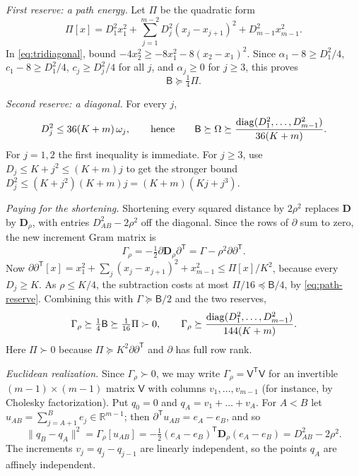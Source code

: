 \documentclass[11pt]{article}
\numberwithin{equation}{section}
\theoremstyle{definition}\newtheorem{definition}[theorem]{Definition}
\theoremstyle{remark}\newtheorem{remark}[theorem]{Remark}
\newcommand{\R}{\mathbb R}\newcommand{\N}{\mathbb N}
\newcommand{\norm}[1]{\lVert #1\rVert}
\newcommand{\T}{\mathsf T}\newcommand{\one}{\mathbf1}
\begin{document}
\emph{First reserve: a path energy.} Let $\Pi$ be the quadratic form
\[
 \Pi[x]=D_1^2x_1^2+\sum_{j=1}^{m-2}D_j^2(x_j-x_{j+1})^2+D_{m-1}^2x_{m-1}^2.
\]
In \eqref{eq:tridiagonal}, bound $-4x_2^2\ge-8x_1^2-8(x_2-x_1)^2$. Since
$\alpha_1-8\ge D_1^2/4$, $c_1-8\ge D_1^2/4$, $c_j\ge D_j^2/4$ for all $j$,
and $\alpha_j\ge0$ for $j\ge3$, this proves
\begin{equation}\label{eq:path-reserve}
 \mathsf B\succeq\tfrac14\Pi.
\end{equation}

\emph{Second reserve: a diagonal.} For every $j$,
\begin{equation}\label{eq:diagonal-reserve}
 D_j^2\le36(K+m)\,\omega_j,
 \qquad\text{hence}\qquad
 \mathsf B\succeq\Omega\succeq\frac{\operatorname{diag}(D_1^2,\ldots,D_{m-1}^2)}{36(K+m)}.
\end{equation}
For $j=1,2$ the first inequality is immediate. For $j\ge3$, use
$D_j\le K+j^2\le(K+m)j$ to get the stronger bound
$D_j^2\le(K+j^2)(K+m)j=(K+m)(Kj+j^3)$.

\emph{Paying for the shortening.} Shortening every squared distance by
$2\rho^2$ replaces $\mathbf D$ by $\mathbf D_\rho$, with entries
$D_{AB}^2-2\rho^2$ off the diagonal. Since the rows of $\partial$ sum to
zero, the new increment Gram matrix is
\[
 \Gamma_\rho=-\tfrac12\partial\mathbf D_\rho\partial^\T
 =\Gamma-\rho^2\partial\partial^\T.
\]
Now $\partial\partial^\T[x]=x_1^2+\sum_j(x_j-x_{j+1})^2+x_{m-1}^2\le
\Pi[x]/K^2$, because every $D_j\ge K$. As $\rho\le K/4$, the subtraction
costs at most $\Pi/16\preceq\mathsf B/4$, by \eqref{eq:path-reserve}.
Combining this with $\Gamma\succeq\mathsf B/2$ and the two reserves,
\begin{equation}\label{eq:both-reserves}
 \Gamma_\rho\succeq\tfrac14\mathsf B\succeq\tfrac1{16}\Pi\succ0,
 \qquad
 \Gamma_\rho\succeq
     \frac{\operatorname{diag}(D_1^2,\ldots,D_{m-1}^2)}{144(K+m)}.
\end{equation}
Here $\Pi\succ0$ because $\Pi\succeq K^2\partial\partial^\T$ and $\partial$
has full row rank.

\emph{Euclidean realization.} Since $\Gamma_\rho\succ0$, we may write
$\Gamma_\rho=\mathsf V^\T\mathsf V$ for an invertible
$(m-1)\times(m-1)$ matrix $\mathsf V$ with columns $v_1,\dots,v_{m-1}$
(for instance, by Cholesky factorization). Put $q_0=0$ and
$q_A=v_1+\dots+v_A$. For $A<B$ let $u_{AB}=\sum_{j=A+1}^Be_j\in\R^{m-1}$;
then $\partial^\T u_{AB}=e_A-e_B$, and so
\[
 \norm{q_B-q_A}^2
 =\Gamma_\rho[u_{AB}]
 =-\tfrac12(e_A-e_B)^\T\mathbf D_\rho(e_A-e_B)
 =D_{AB}^2-2\rho^2.
\]
The increments $v_j=q_j-q_{j-1}$ are linearly independent, so the points
$q_A$ are affinely independent.
\end{document}
